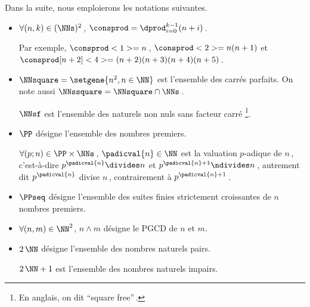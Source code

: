 Dans la suite, nous emploierons les notations suivantes.

\begin{itemize}
	\item $\forall (n, k) \in ( \NNs )^2$\,, $\consprod = \dprod_{i = 0}^{k - 1} (n + i)$\,. 
	
	\noindent
	Par exemple,
	$\consprod<1> = n$\,,
	$\consprod<2> = n (n+1)$
	et
	$\consprod[n+2]<4> = (n+2) (n+3) (n+4) (n+5)$\,.


	\medskip
	\item $\NNsquare = \setgene{n^2, n \in \NN}$ est l'ensemble des carrés parfaits.
	On note aussi $\NNssquare = \NNsquare \cap \NNs$\,.

	\noindent
	$\NNsf$ est l'ensemble des naturels non nuls sans facteur carré
	\footnote{
		En anglais, on dit \enquote{square free}\,.
	}.


	\medskip
	\item $\PP$ désigne l'ensemble des nombres premiers.
	
	\noindent
	$\forall (p ; n) \in \PP \times \NNs$\,, $\padicval{n} \in \NN$ est la valuation $p$-adique de $n$\,,
	c'est-à-dire 
	$p^{\padicval{n}} \divides n$ et $p^{\padicval{n} + 1} \ndivides n$\,,
	autrement dit
	$p^{\padicval{n}}$ divise $n$\,, contrairement à $p^{\padicval{n} + 1}$\,.


	\medskip
	\item $\PPseq$ désigne l'ensemble des suites finies strictement croissantes de $n$ nombres premiers.


	\medskip
	\item $\forall (n , m) \in \NN^2$, $n \wedge m$ désigne le PGCD de $n$ et $m$.

	
	\medskip
	\item $2\,\NN$ désigne l'ensemble des nombres naturels pairs.
	
	\noindent
	$2\,\NN + 1$ est l'ensemble des nombres naturels impairs.
\end{itemize}